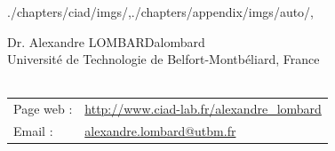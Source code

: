 \begin{graphicspathcontext}{{./chapters/ciad/imgs/},{./chapters/appendix/imgs/auto/},\old}
	
	\begin{textpictureframe}{Dr\string. Alexandre LOMBARD}{alombard}
		\vspace{-.25cm}
		 \\
		\vspace{.25cm}
		{\scriptsize Universit\'e de Technologie de Belfort-Montb\'eliard, France} \\[.25cm]
		
		 \\[.25cm]
		
		\scriptsize \begin{tabularx}{\linewidth}{@{}lX@{}}
			Page web : & \url{http://www.ciad-lab.fr/alexandre_lombard} \\
			Email : & \href{mailto:alexandre.lombard@utbm.fr}{alexandre.lombard@utbm.fr} \\
		\end{tabularx} \\[.5cm]
		
	\end{textpictureframe}
	
\end{graphicspathcontext}

\endinput
